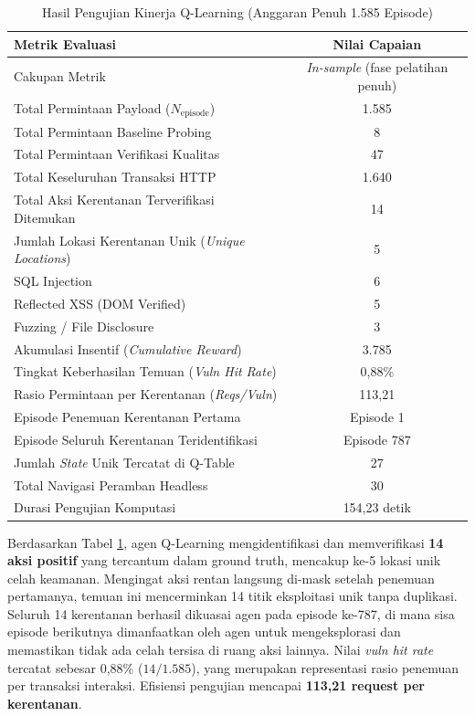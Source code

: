 \begin{table}[H]
\centering
\caption{Hasil Pengujian Kinerja Q-Learning (Anggaran Penuh 1.585 Episode)}
\label{tab:ql_results}
\begin{tabular}{|l|c|}
\hline
\textbf{Metrik Evaluasi} & \textbf{Nilai Capaian} \\
\hline
Cakupan Metrik & \textit{In-sample} (fase pelatihan penuh) \\
Total Permintaan Payload ($N_{\text{episode}}$) & 1.585 \\
Total Permintaan Baseline Probing & 8 \\
Total Permintaan Verifikasi Kualitas & 47 \\ 
Total Keseluruhan Transaksi HTTP & 1.640 \\ 
Total Aksi Kerentanan Terverifikasi Ditemukan & 14 \\
Jumlah Lokasi Kerentanan Unik (\textit{Unique Locations}) & 5 \\
SQL Injection & 6 \\
Reflected XSS (DOM Verified) & 5 \\
Fuzzing / File Disclosure & 3 \\
Akumulasi Insentif (\textit{Cumulative Reward}) & 3.785 \\ 
Tingkat Keberhasilan Temuan (\textit{Vuln Hit Rate}) & 0,88\% \\
Rasio Permintaan per Kerentanan (\textit{Reqs/Vuln}) & 113,21 \\
Episode Penemuan Kerentanan Pertama & Episode 1 \\
Episode Seluruh Kerentanan Teridentifikasi & Episode 787 \\
Jumlah \textit{State} Unik Tercatat di Q-Table & 27 \\ 
Total Navigasi Peramban Headless & 30 \\ 
Durasi Pengujian Komputasi & 154,23 detik \\ 
\hline
\end{tabular}
\end{table}

Berdasarkan Tabel \ref{tab:ql_results}, agen Q-Learning mengidentifikasi dan memverifikasi \textbf{14 aksi positif} yang tercantum dalam ground truth, mencakup ke-5 lokasi unik celah keamanan. Mengingat aksi rentan langsung di-mask setelah penemuan pertamanya, temuan ini mencerminkan 14 titik eksploitasi unik tanpa duplikasi. Seluruh 14 kerentanan berhasil dikuasai agen pada episode ke-787, di mana sisa episode berikutnya dimanfaatkan oleh agen untuk mengeksplorasi dan memastikan tidak ada celah tersisa di ruang aksi lainnya. Nilai \textit{vuln hit rate} tercatat sebesar 0,88\% ($14 / 1.585$), yang merupakan representasi rasio penemuan per transaksi interaksi. Efisiensi pengujian mencapai \textbf{113,21 request per kerentanan}.

